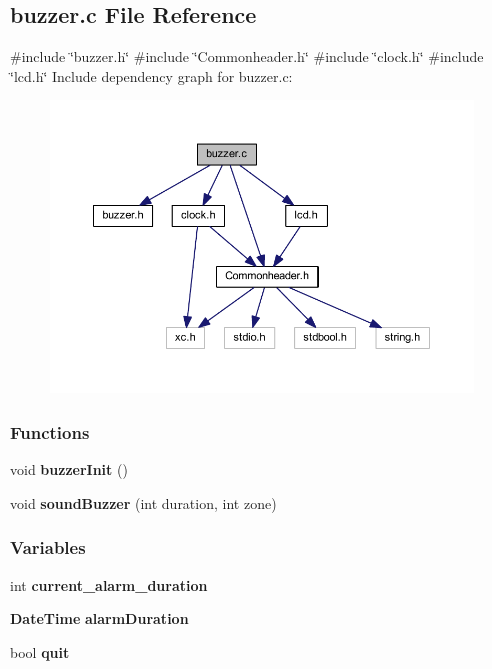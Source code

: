 \subsection{buzzer.\+c File Reference}
\label{a00008}
{\ttfamily \#include \char`\"{}buzzer.\+h\char`\"{}}\newline
{\ttfamily \#include \char`\"{}Commonheader.\+h\char`\"{}}\newline
{\ttfamily \#include \char`\"{}clock.\+h\char`\"{}}\newline
{\ttfamily \#include \char`\"{}lcd.\+h\char`\"{}}\newline
Include dependency graph for buzzer.\+c\+:
\nopagebreak
\begin{figure}[H]
\begin{center}
\leavevmode
\includegraphics[width=350pt]{a00009}
\end{center}
\end{figure}
\subsubsection*{Functions}
\begin{DoxyCompactItemize}
\item 
void \textbf{ buzzer\+Init} ()
\item 
void \textbf{ sound\+Buzzer} (int duration, int zone)
\end{DoxyCompactItemize}
\subsubsection*{Variables}
\begin{DoxyCompactItemize}
\item 
int \textbf{ current\+\_\+alarm\+\_\+duration}
\item 
\textbf{ Date\+Time} \textbf{ alarm\+Duration}
\item 
bool \textbf{ quit}
\end{DoxyCompactItemize}


